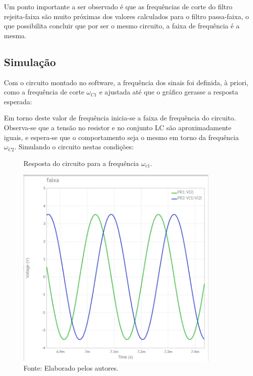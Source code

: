 Um ponto importante a ser observado é que as frequências de corte do filtro rejeita-faixa são muito próximas dos valores calculados para o filtro passa-faixa, o que possibilita concluir que por ser o mesmo circuito, a faixa de frequência é a mesma.

\subsection{Simulação}

Com o circuito montado no software, a frequência dos sinais foi definida, à priori, como a frequência de corte $\omega_{C1}$ e ajustada até que o gráfico gerasse a resposta esperada:

Em torno deste valor de frequência inicia-se a faixa de frequência do circuito. Observa-se que a tensão no resistor e no conjunto LC são aproximadamente iguais, e espera-se que o comportamento seja o mesmo em torno da frequência $\omega_{C2}$. Simulando o circuito nestas condições:

\begin{figure}[H]
	\centering
	\caption{Resposta do circuito para a frequência $\omega_{c1}$.}
	\includegraphics[width=10cm]{imagens/f_c1.png}
	\caption*{Fonte: Elaborado pelos autores.}
	\label{c1}
\end{figure}

